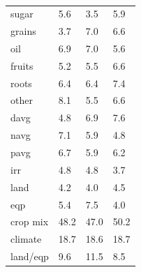 \documentclass[11pt]{article}
\begin{document}
\begin{table}[h!]
{\begin{tabular}{llll}
sugar & 5.6 & 3.5 & 5.9 \\
grains & 3.7 & 7.0 & 6.6 \\
oil & 6.9 & 7.0 & 5.6 \\
fruits & 5.2 & 5.5 & 6.6 \\
roots & 6.4 & 6.4 & 7.4 \\
other & 8.1 & 5.5 & 6.6 \\
davg & 4.8 & 6.9 & 7.6 \\
navg & 7.1 & 5.9 & 4.8 \\
pavg & 6.7 & 5.9 & 6.2 \\
irr & 4.8 & 4.8 & 3.7 \\
land & 4.2 & 4.0 & 4.5 \\
eqp & 5.4 & 7.5 & 4.0 \\
\midrule
crop mix & 48.2 & 47.0 & 50.2 \\
climate & 18.7 & 18.6 & 18.7 \\
land/eqp & 9.6 & 11.5 & 8.5 \\
\bottomrule
\end{tabular}
\caption{ }
\label{t.wy.trop_percentages}
}
\end{table}
\end{document}
